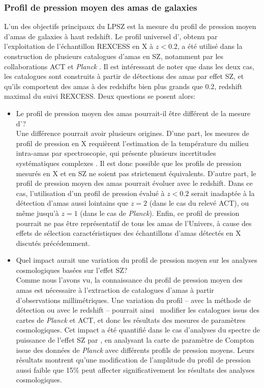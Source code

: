 \subsubsection{Profil de pression moyen des amas de galaxies} %
L'un des objectifs principaux du LPSZ est la mesure du profil de pression moyen d'amas de galaxies à haut redshift.
Le profil universel d', obtenu par l'exploitation de l'échantillon REXCESS en X à $z < 0.2$, a été utilisé dans la construction de plusieurs catalogues d'amas en SZ, notamment par les collaborations ACT \cite{hilton_atacama_2021} et \textit{Planck} \cite{planck_collaboration_planck_2016-3}.
Il est intéressant de noter que dans les deux cas, les catalogues sont construits à partir de détections des amas par effet SZ, et qu'ils comportent des amas à des redshifts bien plus grands que 0.2, redshift maximal du suivi REXCESS.
Deux questions se posent alors:
\begin{itemize}[leftmargin=*]
\setlength\itemsep{5pt}
\item
    Le profil de pression moyen des amas pourrait-il être différent de la mesure d'\citeauthor{arnaud_universal_2010}? \\
    Une différence pourrait avoir plusieurs origines.
    D'une part, les mesures de profil de pression en X requièrent l'estimation de la température du milieu intra-amas par spectroscopie, qui présente plusieurs incertitudes systématiques complexes \cite{bohringer_x-ray_2010}.
    Il est donc possible que les profils de pression mesurés en X et en SZ ne soient pas strictement équivalents.
    D'autre part, le profil de pression moyen des amas pourrait évoluer avec le redshift.
    Dans ce cas, l'utilisation d'un profil de pression évalué à $z < 0.2$ serait inadaptée à la détection d'amas aussi lointains que $z=2$ (dans le cas du relevé ACT), ou même jusqu'à $z=1$ (dans le cas de \textit{Planck}).
    Enfin, ce profil de pression pourrait ne pas être représentatif de tous les amas de l'Univers, à cause des effets de sélection caractéristiques des échantillons d'amas détectés en X discutés précédemment.
\item
Quel impact aurait une variation du profil de pression moyen sur les analyses cosmologiques basées sur l'effet SZ? \\
    Comme nous l'avons vu, la connaissance du profil de pression moyen des amas est nécessaire à l'extraction de catalogues d'amas à partir d'observations millimétriques.
    Une variation du profil -- avec la méthode de détection ou avec le redshift -- pourrait ainsi \prior\ modifier les catalogues issus des cartes de \textit{Planck} et ACT, et donc les résultats des mesures de paramètres cosmologiques.
    Cet impact a été quantifié dans le cas d'analyses du spectre de puissance de l'effet SZ par , en analysant la carte de paramètre de Compton issue des données de \textit{Planck} \cite{planck_collaboration_planck_2016-4} avec différents profils de pression moyens.
    Leurs résultats montrent qu'une modification de l'amplitude du profil de pression aussi faible que 15\% peut affecter significativement les résultats des analyses cosmologiques.
\end{itemize}

